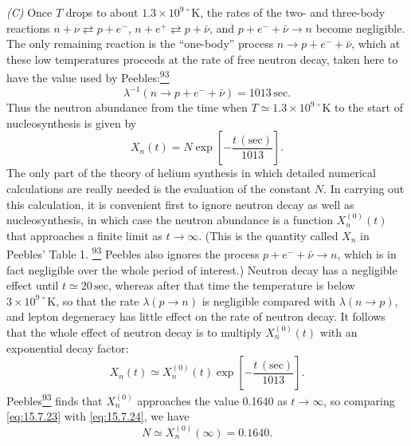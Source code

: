 \emph{(C)} Once \(T\) drops to about \(1.3\times10^{9\,\circ}\mathrm K\),
the rates of the two- and three-body reactions
\(n+\nu\rightleftarrows p+e^-\),
\(n+e^+\rightleftarrows p+\bar\nu\), and
\(p+e^-+\bar\nu\to n\) become negligible. The only remaining reaction is
the ``one-body'' process \(n\to p+e^-+\bar\nu\), which at these low
temperatures proceeds at the rate of free neutron decay, taken here to have
the value used by Peebles:\hyperref[ch15-ref-93]{\textsuperscript{93}}
\begin{equation}
  \lambda^{-1}(n\to p+e^-+\bar\nu)=1013\,\mathrm{sec}.
  \tag{15.7.22}\label{eq:15.7.22}
\end{equation}
Thus the neutron abundance from the time when
\(T\simeq1.3\times10^{9\,\circ}\mathrm K\) to the start of nucleosynthesis
is given by
\begin{equation}
  X_n(t)
  =
  N\exp\left[-\frac{t\,(\mathrm{sec})}{1013}\right].
  \tag{15.7.23}\label{eq:15.7.23}
\end{equation}
The only part of the theory of helium synthesis in which detailed numerical
calculations are really needed is the evaluation of the constant \(N\). In
carrying out this calculation, it is convenient first to ignore neutron decay
as well as nucleosynthesis, in which case the neutron abundance is a function
\(X_n^{(0)}(t)\) that approaches a finite limit as \(t\to\infty\). (This is
the quantity called \(X_n\) in Peebles' Table 1.%
\hyperref[ch15-ref-93]{\textsuperscript{93}} Peebles also ignores the
process \(p+e^-+\bar\nu\to n\), which is in fact negligible over the whole
period of interest.) Neutron decay has a negligible effect until
\(t\simeq20\,\mathrm{sec}\), whereas after that time the temperature is
below \(3\times10^{9\,\circ}\mathrm K\), so that the rate
\(\lambda(p\to n)\) is negligible compared with \(\lambda(n\to p)\), and
lepton degeneracy has little effect on the rate of neutron decay. It follows
that the whole effect of neutron decay is to multiply \(X_n^{(0)}(t)\) with
an exponential decay factor:
\begin{equation}
  X_n(t)
  \simeq
  X_n^{(0)}(t)
  \exp\left[-\frac{t\,(\mathrm{sec})}{1013}\right].
  \tag{15.7.24}\label{eq:15.7.24}
\end{equation}
Peebles\hyperref[ch15-ref-93]{\textsuperscript{93}} finds that
\(X_n^{(0)}\) approaches the value 0.1640 as \(t\to\infty\), so comparing
\eqref{eq:15.7.23} with \eqref{eq:15.7.24}, we have
\begin{equation}
  N\simeq X_n^{(0)}(\infty)=0.1640.
  \tag{15.7.25}\label{eq:15.7.25}
\end{equation}

